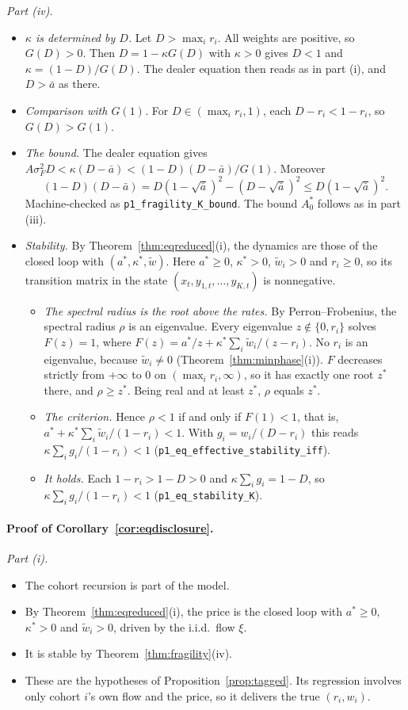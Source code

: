 \emph{Part (iv).}
\begin{itemize}[itemsep=1pt,topsep=2pt]
\item \emph{$\kappa$ is determined by $D$.} Let $D>\max_ir_i$. All weights are positive, so $G(D)>0$. Then $D=1-\kappa G(D)$ with $\kappa>0$ gives $D<1$ and $\kappa=(1-D)/G(D)$. The dealer equation then reads as in part (i), and $D>\bar a$ as there.
\item \emph{Comparison with $G(1)$.} For $D\in(\max_ir_i,1)$, each $D-r_i<1-r_i$, so $G(D)>G(1)$.
\item \emph{The bound.} The dealer equation gives $A\sigma_F^2D<\kappa(D-\bar a)<(1-D)(D-\bar a)/G(1)$. Moreover
\[
 (1-D)(D-\bar a)=D(1-\sqrt{\bar a})^2-(D-\sqrt{\bar a})^2\le D(1-\sqrt{\bar a})^2.
\]
Machine-checked as \nolinkurl{p1_fragility_K_bound}. The bound $A^*_0$ follows as in part (iii).
\item \emph{Stability.} By Theorem~\ref{thm:eqreduced}(i), the dynamics are those of the closed loop with $(a^*,\kappa^*,\tilde w)$. Here $a^*\ge0$, $\kappa^*>0$, $\tilde w_i>0$ and $r_i\ge0$, so its transition matrix in the state $(x_t,y_{1,t},\ldots,y_{K,t})$ is nonnegative.
 \begin{itemize}[itemsep=1pt,topsep=2pt]
 \item \emph{The spectral radius is the root above the rates.} By Perron--Frobenius, the spectral radius $\rho$ is an eigenvalue. Every eigenvalue $z\notin\{0,r_i\}$ solves $F(z)=1$, where $F(z)=a^*/z+\kappa^*\sum_i\tilde w_i/(z-r_i)$. No $r_i$ is an eigenvalue, because $\tilde w_i\ne0$ (Theorem~\ref{thm:minphase}(i)). $F$ decreases strictly from $+\infty$ to $0$ on $(\max_ir_i,\infty)$, so it has exactly one root $z^*$ there, and $\rho\ge z^*$. Being real and at least $z^*$, $\rho$ equals $z^*$.
 \item \emph{The criterion.} Hence $\rho<1$ if and only if $F(1)<1$, that is, $a^*+\kappa^*\sum_i\tilde w_i/(1-r_i)<1$. With $g_i=w_i/(D-r_i)$ this reads $\kappa\sum_ig_i/(1-r_i)<1$ (\nolinkurl{p1_eq_effective_stability_iff}).
 \item \emph{It holds.} Each $1-r_i>1-D>0$ and $\kappa\sum_ig_i=1-D$, so $\kappa\sum_ig_i/(1-r_i)<1$ (\nolinkurl{p1_eq_stability_K}).
 \end{itemize}
\end{itemize}

\paragraph{Proof of Corollary~\ref{cor:eqdisclosure}.}
\emph{Part (i).}
\begin{itemize}[itemsep=1pt,topsep=2pt]
\item The cohort recursion is part of the model.
\item By Theorem~\ref{thm:eqreduced}(i), the price is the closed loop with $a^*\ge0$, $\kappa^*>0$ and $\tilde w_i>0$, driven by the i.i.d.\ flow $\xi$.
\item It is stable by Theorem~\ref{thm:fragility}(iv).
\item These are the hypotheses of Proposition~\ref{prop:tagged}. Its regression involves only cohort $i$'s own flow and the price, so it delivers the true $(r_i,w_i)$.
\end{itemize}

